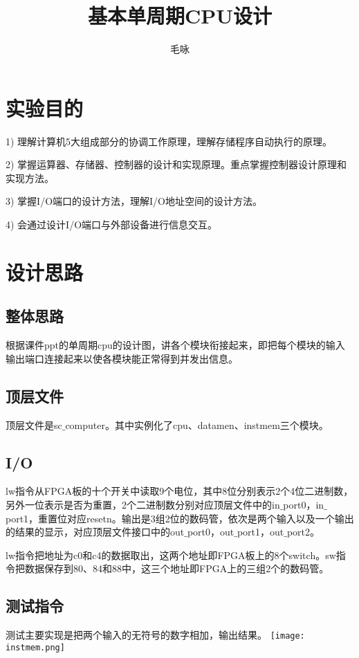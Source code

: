 \documentclass{article}
\author{毛咏}
\title{基本单周期CPU设计}
\begin{document}
	\maketitle
    \tableofcontents
    \newpage
    
    \section{实验目的}
    
    	\par 1) 理解计算机5大组成部分的协调工作原理，理解存储程序自动执行的原理。
        \par 2) 掌握运算器、存储器、控制器的设计和实现原理。重点掌握控制器设计原理和实现方法。
        \par 3) 掌握I/O端口的设计方法，理解I/O地址空间的设计方法。
        \par 4) 会通过设计I/O端口与外部设备进行信息交互。
	
	\section{设计思路}
    
    	\subsection{整体思路} 根据课件ppt的单周期cpu的设计图，讲各个模块衔接起来，即把每个模块的输入输出端口连接起来以使各模块能正常得到并发出信息。
        
        \subsection{顶层文件} 顶层文件是sc$\_$computer。其中实例化了cpu、datamen、instmem三个模块。
        
        \subsection{I/O} lw指令从FPGA板的十个开关中读取9个电位，其中8位分别表示2个4位二进制数，另外一位表示是否为重置，2个二进制数分别对应顶层文件中的in$\_$port0，in$\_$port1，重置位对应resetn。输出是3组2位的数码管，依次是两个输入以及一个输出的结果的显示，对应顶层文件接口中的out$\_$port0，out$\_$port1，out$\_$port2。
        \par lw指令把地址为c0和c4的数据取出，这两个地址即FPGA板上的8个switch。sw指令把数据保存到80、84和88中，这三个地址即FPGA上的三组2个的数码管。
        
        \subsection{测试指令} 测试主要实现是把两个输入的无符号的数字相加，输出结果。
        \newline
        \texttt{[image: instmem.png]}
        
\end{document}
